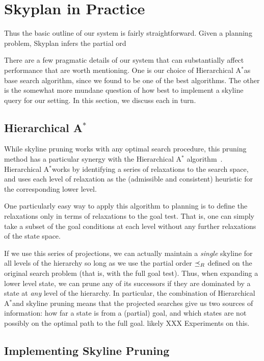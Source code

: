 \documentclass[letterpaper]{article}
\theoremstyle{plain} \newtheorem{theorem}{Theorem} \newtheorem{proposition}{Proposition} \newtheorem{lemma}{Lemma}
\theoremstyle{definition} \newtheorem{definition}{Definition} \newtheorem{conjecture}{Conjecture} \newtheorem*{example}{Example}
\theoremstyle{remark} \newtheorem*{remark}{Remark} \newtheorem*{note}{Note} \newtheorem{case}{Case}
\newcommand{\Astar}{A$^*$}
\begin{document}
\section{Skyplan in Practice}

Thus the basic outline of our system is fairly straightforward.
Given a planning problem, Skyplan infers the partial ord

There are a few pragmatic details of our system that can substantially
affect performance that are worth mentioning. One is our choice of
Hierarchical \Astar as base search algorithm, since we found to be
one of the best algorithms. The other is the somewhat more mundane
question of how best to implement a skyline query for our setting.
In this section, we discuss each in turn.

\subsection{Hierarchical \Astar}

While skyline pruning works with any optimal search procedure, this
pruning method has a particular synergy with the Hierarchical \Astar
algorithm~\citep{holte1996hierarchical}. Hierarchical \Astar works
by identifying a series of relaxations to the search space, and
uses each level of relaxation as the (admissible and consistent)
heuristic for the corresponding lower level. 

One particularly easy way to apply this algorithm to planning is
to define the relaxations only in terms of relaxations to the goal
test. That is, one can simply take a subset of the goal conditions
at each level without any further relaxations of the state space. 

If we use this series of projections, we can actually maintain a
\textit{single} skyline for all levels of the hierarchy so long as
we use the partial order $\preceq_R$ defined on the original search problem
(that is, with the full goal test). Thus, when expanding a lower
level state, we can prune any of its successors if they are dominated
by a state at \textit{any} level of the hierarchy.  In particular,
the combination of Hierarchical \Astar and skyline pruning means
that the projected searches give us two sources of information: how
far a state is from a (partial) goal, and which states are not
possibly on the optimal path to the full goal. likely XXX Experiments
on this.

\subsection{Implementing Skyline Pruning}
\end{document}
